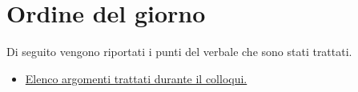 \clearpage
\section{Ordine del giorno}
Di seguito vengono riportati i punti del verbale che sono stati trattati.
\begin{itemize}
	\item \hyperref[sec:elenco]{Elenco argomenti trattati durante il colloqui.}
\end{itemize}